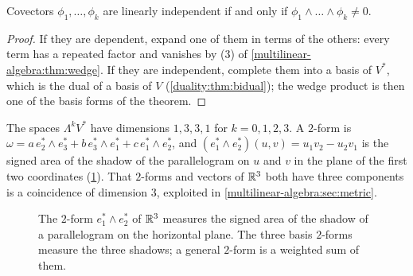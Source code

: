 \begin{notechapter}
\begin{corollary}\label{multilinear-algebra:cor:independent}
Covectors $\phi_1,\dots,\phi_k$ are linearly independent if and only
if $\phi_1\wedge\dots\wedge\phi_k\neq0$.
\end{corollary}

\begin{proof}
If they are dependent, expand one of them in terms of the others: every
term has a repeated factor and vanishes by (3) of
\cref{multilinear-algebra:thm:wedge}. If they are independent,
complete them into a basis of $V^*$, which is the dual of a basis of
$V$ (\cref{duality:thm:bidual}); the wedge product is then one of the
basis forms of the theorem.
\end{proof}

\begin{example}[Forms on $\R^3$]\label{multilinear-algebra:ex:r3}
The spaces $\Lambda^kV^*$ have dimensions $1, 3, 3, 1$ for
$k = 0, 1, 2, 3$. A $2$-form is
$\omega = a\,e_2^*\wedge e_3^* + b\,e_3^*\wedge e_1^*
+ c\,e_1^*\wedge e_2^*$, and $(e_1^*\wedge e_2^*)(u, v)
= u_1v_2 - u_2v_1$ is the signed area of the shadow of the parallelogram
on $u$ and $v$ in the plane of the first two coordinates
(\cref{multilinear-algebra:fig:shadow}). That $2$-forms and vectors of
$\R^3$ both have three components is a coincidence of dimension $3$,
exploited in \cref{multilinear-algebra:sec:metric}.
\end{example}

\begin{figure}[ht]
\centering
{}
\caption{The $2$-form $e_1^*\wedge e_2^*$ of $\R^3$ measures the signed
area of the shadow of a parallelogram on the horizontal plane. The
three basis $2$-forms measure the three shadows; a general $2$-form is a
weighted sum of them.}
\label{multilinear-algebra:fig:shadow}
\end{figure}


\end{notechapter}
